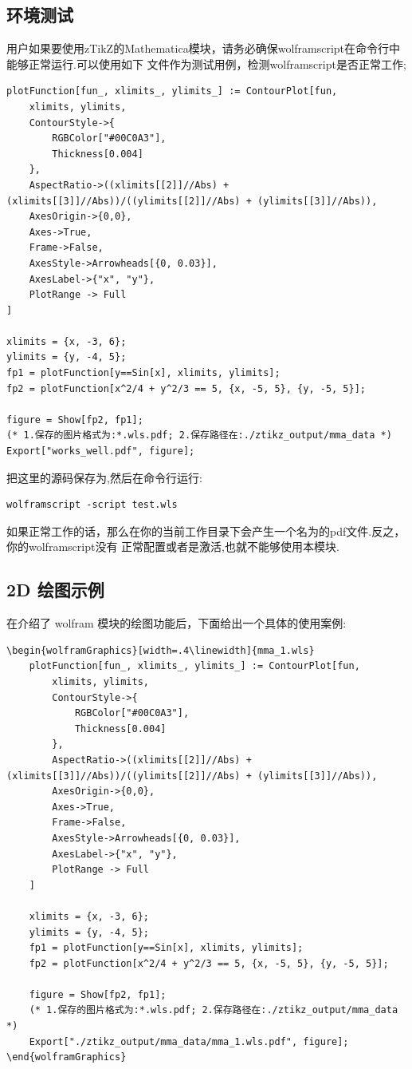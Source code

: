 \documentclass[
  hyper,    
  lang=cn,
  class=book,
  bib_index={load},
  mathSpec={envStyle=leftbar, alias},
  toc={column=2, title=目录},
]{zlatex}
\let\cmd\ztexverb
\begin{document}
\subsection{环境测试}
用户如果要使用zTikZ的Mathematica模块，请务必确保wolframscript在命令行中能够正常运行.可以使用如下
文件作为测试用例，检测wolframscript是否正常工作; 
\begin{verbatim}
plotFunction[fun_, xlimits_, ylimits_] := ContourPlot[fun, 
    xlimits, ylimits,
    ContourStyle->{
        RGBColor["#00C0A3"], 
        Thickness[0.004]
    },
    AspectRatio->((xlimits[[2]]//Abs) + (xlimits[[3]]//Abs))/((ylimits[[2]]//Abs) + (ylimits[[3]]//Abs)), 
    AxesOrigin->{0,0}, 
    Axes->True,
    Frame->False,
    AxesStyle->Arrowheads[{0, 0.03}],
    AxesLabel->{"x", "y"},
    PlotRange -> Full
]

xlimits = {x, -3, 6};
ylimits = {y, -4, 5};
fp1 = plotFunction[y==Sin[x], xlimits, ylimits];
fp2 = plotFunction[x^2/4 + y^2/3 == 5, {x, -5, 5}, {y, -5, 5}];

figure = Show[fp2, fp1];
(* 1.保存的图片格式为:*.wls.pdf; 2.保存路径在:./ztikz_output/mma_data *)
Export["works_well.pdf", figure];
\end{verbatim}

把这里的源码保存为\cmd{test.wls},然后在命令行运行:
\begin{verbatim}
wolframscript -script test.wls
\end{verbatim}

如果正常工作的话，那么在你的当前工作目录下会产生一个名为\cmd{works_well.pdf}的pdf文件.反之，你的wolframscript没有
正常配置或者是激活,也就不能够使用本模块.


\subsection{2D 绘图示例}
在介绍了 wolfram 模块的绘图功能后，下面给出一个具体的使用案例:

\begin{verbatim}
\begin{wolframGraphics}[width=.4\linewidth]{mma_1.wls}
    plotFunction[fun_, xlimits_, ylimits_] := ContourPlot[fun, 
        xlimits, ylimits,
        ContourStyle->{
            RGBColor["#00C0A3"], 
            Thickness[0.004]
        },
        AspectRatio->((xlimits[[2]]//Abs) + (xlimits[[3]]//Abs))/((ylimits[[2]]//Abs) + (ylimits[[3]]//Abs)), 
        AxesOrigin->{0,0}, 
        Axes->True,
        Frame->False,
        AxesStyle->Arrowheads[{0, 0.03}],
        AxesLabel->{"x", "y"},
        PlotRange -> Full
    ]
    
    xlimits = {x, -3, 6};
    ylimits = {y, -4, 5};
    fp1 = plotFunction[y==Sin[x], xlimits, ylimits];
    fp2 = plotFunction[x^2/4 + y^2/3 == 5, {x, -5, 5}, {y, -5, 5}];
    
    figure = Show[fp2, fp1];
    (* 1.保存的图片格式为:*.wls.pdf; 2.保存路径在:./ztikz_output/mma_data *)
    Export["./ztikz_output/mma_data/mma_1.wls.pdf", figure];
\end{wolframGraphics}
\end{verbatim}
\end{document}
